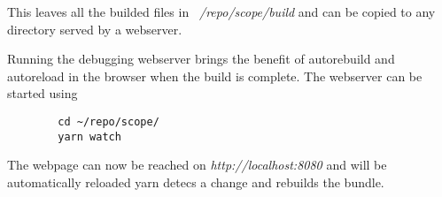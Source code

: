This leaves  all the builded  files in \textit{~/repo/scope/build} and  can be
copied to any directory served by a webserver.

Running  the  debugging  webserver  brings  the  benefit  of  autorebuild  and
autoreload in  the browser when  the build  is complete. The webserver  can be
started using

\begin{listing}
    \begin{verbatim}
        cd ~/repo/scope/
        yarn watch
    \end{verbatim}
\end{listing}

The webpage can  now be reached on \textit{http://localhost:8080}  and will be
automatically reloaded yarn detecs a change and rebuilds the bundle.



